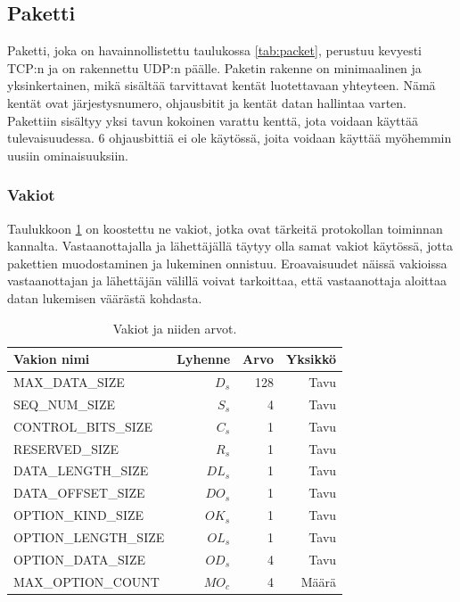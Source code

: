 \documentclass[a4paper,12pt]{article}
\begin{document}
    \subsection{Paketti}\label{sec:paketti}
    Paketti, joka on havainnollistettu taulukossa \ref{tab:packet}, perustuu kevyesti TCP:n ja on rakennettu UDP:n päälle. Paketin rakenne on minimaalinen ja yksinkertainen, mikä sisältää tarvittavat kentät luotettavaan yhteyteen. Nämä kentät ovat järjestysnumero, ohjausbitit ja kentät datan hallintaa varten. Pakettiin sisältyy yksi tavun kokoinen varattu kenttä, jota voidaan käyttää tulevaisuudessa. 6 ohjausbittiä ei ole käytössä, joita voidaan käyttää myöhemmin uusiin ominaisuuksiin.

    \subsubsection*{Vakiot}
    Taulukkoon \ref{tab:vakiot} on koostettu ne vakiot, jotka ovat tärkeitä protokollan toiminnan kannalta. Vastaanottajalla ja lähettäjällä täytyy olla samat vakiot käytössä, jotta pakettien muodostaminen ja lukeminen onnistuu. Eroavaisuudet näissä vakioissa vastaanottajan ja lähettäjän välillä voivat tarkoittaa, että vastaanottaja aloittaa datan lukemisen väärästä kohdasta.

    \begin{table}[h!]
        \centering
        \begin{tabularx}{\textwidth}{|X|r|r|r|}
        \hline
            \textbf{Vakion nimi}          & \textbf{Lyhenne} & \textbf{Arvo} & \textbf{Yksikkö} \\ \hline
            MAX\_DATA\_SIZE      & $D_s$   & 128  & Tavu    \\ \hline
            SEQ\_NUM\_SIZE       & $S_s$   & 4    & Tavu    \\ \hline
            CONTROL\_BITS\_SIZE  & $C_s$   & 1    & Tavu    \\ \hline
            RESERVED\_SIZE       & $R_s$   & 1    & Tavu    \\ \hline
            DATA\_LENGTH\_SIZE   & $DL_s$  & 1    & Tavu    \\ \hline
            DATA\_OFFSET\_SIZE   & $DO_s$  & 1    & Tavu    \\ \hline
            OPTION\_KIND\_SIZE   & $OK_s$  & 1    & Tavu    \\ \hline
            OPTION\_LENGTH\_SIZE & $OL_s$  & 1    & Tavu    \\ \hline
            OPTION\_DATA\_SIZE   & $OD_s$  & 4    & Tavu    \\ \hline
            MAX\_OPTION\_COUNT   & $MO_c$  & 4    & Määrä \\  \hline
        \end{tabularx}
        \caption{Vakiot ja niiden arvot.}
        \label{tab:vakiot}
    \end{table}
\end{document}
